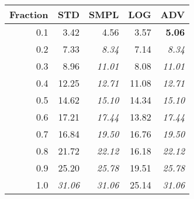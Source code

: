 \documentclass{standalone}
\begin{document}
\begin{tabular}{r|rrrr}
      \toprule
      Fraction & STD & SMPL & LOG & ADV\\
      \midrule
      0.1 & 3.42 & 4.56 & 3.57 & \textbf{5.06}\\
  0.2 & 7.33 & \emph{8.34} & 7.14 & \emph{8.34}\\
  0.3 & 8.96 & \emph{11.01} & 8.08 & \emph{11.01}\\
  0.4 & 12.25 & \emph{12.71} & 11.08 & \emph{12.71}\\
  0.5 & 14.62 & \emph{15.10} & 14.34 & \emph{15.10}\\
  0.6 & 17.21 & \emph{17.44} & 13.82 & \emph{17.44}\\
  0.7 & 16.84 & \emph{19.50} & 16.76 & \emph{19.50}\\
  0.8 & 21.72 & \emph{22.12} & 16.18 & \emph{22.12}\\
  0.9 & 25.20 & \emph{25.78} & 19.51 & \emph{25.78}\\
  1.0 & \emph{31.06} & \emph{31.06} & 25.14 & \emph{31.06}\\
  \bottomrule
\end{tabular}
\end{document}
